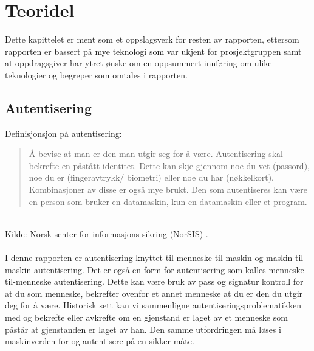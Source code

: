 \chapter{Teoridel}
\label{chap:teoridel}
Dette kapittelet er ment som et oppslagsverk for resten av rapporten, ettersom rapporten er bassert på mye teknologi som var ukjent for prosjektgruppen samt at oppdragsgiver har ytret ønske om en oppsummert innføring om ulike teknologier og begreper som omtales i rapporten. 

\section{Autentisering}
\label{sec:teoridel_autentisering}
Definisjonsjon på autentisering:
\\
\begin{quote}
Å bevise at man er den man utgir seg for å være. Autentisering skal bekrefte en påstått identitet. Dette kan skje gjennom noe du vet (passord), noe du er (fingeravtrykk/ biometri) eller noe du har (nøkkelkort). Kombinasjoner av disse er også mye brukt. Den som autentiseres kan være en person som bruker en datamaskin, kun en datamaskin eller et program.
\end{quote}
\\
Kilde: Norsk senter for informasjons sikring (NorSIS) \cite{NorsisLeksikonAutentisering}.
\\
\\
I denne rapporten er autentisering knyttet til menneske-til-maskin og maskin-til-maskin autentisering. Det er også en form for autentisering som kalles menneske-til-menneske autentisering. Dette kan være bruk av pass og signatur kontroll for at du som menneske, bekrefter ovenfor et annet menneske at du er den du utgir deg for å være. Historisk sett kan vi sammenligne autentiseringsproblematikken med og bekrefte eller avkrefte om en gjenstand er laget av et menneske som påstår at gjenstanden er laget av han. Den samme utfordringen må løses i maskinverden for og autentisere på en sikker måte.

